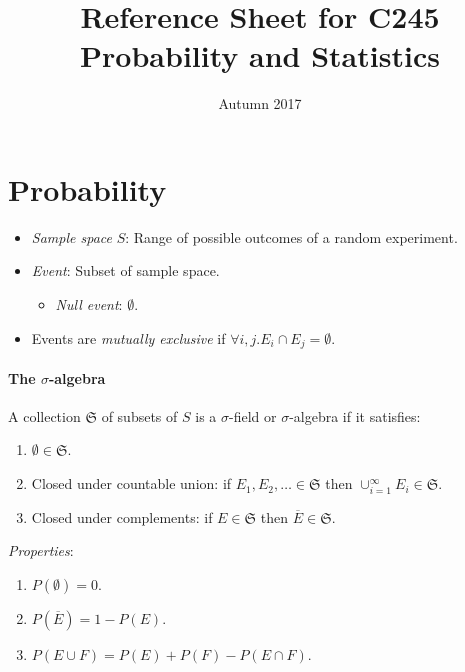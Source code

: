 \documentclass[twocolumn,english]{article}
\begin{document}
\title{Reference Sheet for C245 Probability and Statistics}

\date{Autumn 2017}
\maketitle

\section{Probability}
\begin{itemize}
\item \emph{Sample space} $S$: Range of possible outcomes of a random experiment.
\item \emph{Event}: Subset of sample space.
\begin{itemize}
\item \emph{Null event}: $\emptyset$.
\end{itemize}
\item Events are \emph{mutually exclusive} if $\forall i,j.E_{i}\cap E_{j}=\emptyset$.
\end{itemize}

\paragraph{The $\sigma$-algebra}

A collection $\mathfrak{S}$ of subsets of $S$ is a $\sigma$-field
or $\sigma$-algebra if it satisfies:
\begin{enumerate}
\item $\emptyset\in\mathfrak{S}$.
\item Closed under countable union: if $E_{1},E_{2},\dots\in\mathfrak{S}$
then $\cup_{i=1}^{\infty}E_{i}\in\mathfrak{S}$.
\item Closed under complements: if $E\in\mathfrak{S}$ then $\overline{E}\in\mathfrak{S}$.
\end{enumerate}
\emph{Properties}:
\begin{enumerate}
\item $P\left(\emptyset\right)=0$.
\item $P\left(\overline{E}\right)=1-P\left(E\right)$.
\item $P\left(E\cup F\right)=P\left(E\right)+P\left(F\right)-P\left(E\cap F\right)$.
\end{enumerate}
\end{document}
